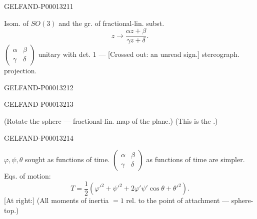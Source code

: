 \begin{GelfandAdjacentEvidence}{GELFAND-P000132}{11}

Isom. of $SO (3)$ and the gr. of fractional-lin. subst.
\begin{equation*}z\longrightarrow\frac{\alpha z+\beta}{\gamma z+\delta}.\end{equation*}
$\begin{pmatrix}\alpha&\beta\\\gamma&\delta\end{pmatrix}$ unitary with det. $1$ — [Crossed out: an unread sign.] stereograph. projection.
\end{GelfandAdjacentEvidence}
\begin{GelfandAdjacentEvidence}{GELFAND-P000132}{12}

\end{GelfandAdjacentEvidence}
\begin{GelfandAdjacentEvidence}{GELFAND-P000132}{13}

(Rotate the sphere — fractional-lin. map of the plane.) (This is the .)

\end{GelfandAdjacentEvidence}
\begin{GelfandAdjacentEvidence}{GELFAND-P000132}{14}

$\varphi,\psi,\theta$ sought as functions of time. $\begin{pmatrix}\alpha&\beta\\\gamma&\delta\end{pmatrix}$ as functions of time are simpler.
Eqs. of motion:
\begin{equation*}T=\frac12(\varphi'^2+\psi'^2+2\varphi'\psi'\cos\theta+\theta'^2).\end{equation*}
[At right:] (All moments of inertia $=1$ rel. to the point of attachment — sphere-top.)
\end{GelfandAdjacentEvidence}
